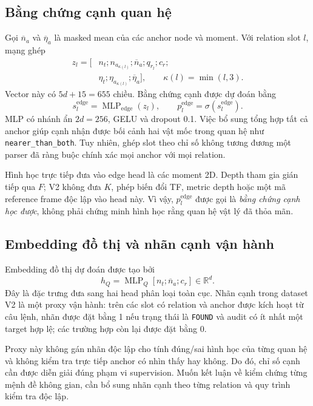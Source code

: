 \subsection{Bằng chứng cạnh quan hệ}

Gọi $\overline{n}_a$ và $\overline{\eta}_a$ là masked mean của các
anchor node và moment. Với relation slot $l$, mạng ghép
\begin{equation}
\begin{split}
    z_l=[&
    n_t;n_{a_{\kappa(l)}};\overline{n}_a;q_{r_l};c_r;\\
    &\eta_t;\eta_{a_{\kappa(l)}};\overline{\eta}_a],
    \qquad \kappa(l)=\min(l,3).
\end{split}
\end{equation}
Vector này có $5d+15=655$ chiều. Bằng chứng cạnh được dự đoán bằng
\begin{equation}
    s_l^{\mathrm{edge}}=\operatorname{MLP}_{\mathrm{edge}}(z_l),
    \qquad
    p_l^{\mathrm{edge}}=\sigma(s_l^{\mathrm{edge}}).
\end{equation}
MLP có nhánh ẩn $2d=256$, GELU và dropout 0.1.
Việc bổ sung tổng hợp tất cả anchor giúp cạnh nhận được bối cảnh
hai vật mốc trong quan hệ như \texttt{nearer\_than\_both}.
Tuy nhiên, ghép slot theo chỉ số không tương đương một parser đã
ràng buộc chính xác mọi anchor với mọi relation.

Hình học trực tiếp đưa vào edge head là các moment 2D.
Depth tham gia gián tiếp qua $F$; V2 không đưa $K$, phép biến đổi TF,
metric depth hoặc một mã reference frame độc lập vào head này.
Vì vậy, $p_l^{\mathrm{edge}}$ được gọi là \emph{bằng chứng cạnh học được},
không phải chứng minh hình học rằng quan hệ vật lý đã thỏa mãn.

\subsection{Embedding đồ thị và nhãn cạnh vận hành}

Embedding đồ thị dự đoán được tạo bởi
\begin{equation}
    h_Q=\operatorname{MLP}_Q[n_t;\overline{n}_a;c_r]\in\mathbb{R}^{d}.
\end{equation}
Đây là đặc trưng đưa sang hai head phân loại toàn cục.
Nhãn cạnh trong dataset V2 là một proxy vận hành: trên các slot
có relation và anchor được kích hoạt từ câu lệnh, nhãn được đặt
bằng 1 nếu trạng thái là \texttt{FOUND} và audit có ít nhất một
target hợp lệ; các trường hợp còn lại được đặt bằng 0.

Proxy này không gán nhãn độc lập cho tính đúng/sai hình học của
từng quan hệ và không kiểm tra trực tiếp anchor có nhìn thấy hay không.
Do đó, chỉ số cạnh cần được diễn giải đúng phạm vi supervision.
Muốn kết luận về kiểm chứng từng mệnh đề không gian, cần bổ sung
nhãn cạnh theo từng relation và quy trình kiểm tra độc lập.

